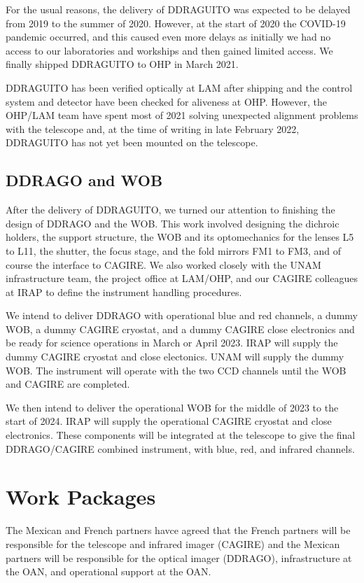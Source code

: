 \documentclass{article}
\begin{document}
For the usual reasons, the delivery of DDRAGUITO was expected to be delayed from 2019 to the summer of 2020. However, at the start of 2020 the COVID-19 pandemic occurred, and this caused even more delays as initially we had no access to our laboratories and workships and then gained limited access. We finally shipped DDRAGUITO to OHP in March 2021.

DDRAGUITO has been verified optically at LAM after shipping and the control system and detector have been checked for aliveness at OHP. However, the OHP/LAM team have spent most of 2021 solving unexpected alignment problems with the telescope and, at the time of writing in late February 2022, DDRAGUITO has not yet been mounted on the telescope.

\subsection{DDRAGO and WOB}

After the delivery of DDRAGUITO, we turned our attention to finishing the design of DDRAGO and the WOB. This work involved designing the dichroic holders, the support structure, the WOB and its optomechanics for the lenses L5 to L11, the shutter, the focus stage, and the fold mirrors FM1 to FM3, and of course the interface to CAGIRE. We also worked closely with the UNAM infrastructure team, the project office at LAM/OHP, and our CAGIRE colleagues at IRAP to define the instrument handling procedures.

We intend to deliver DDRAGO with operational blue and red channels, a dummy WOB, a dummy CAGIRE cryostat, and a dummy CAGIRE close electronics and be ready for science operations in March or April 2023. IRAP will supply the dummy CAGIRE cryostat and close electonics. UNAM will supply the dummy WOB. The instrument will operate with the two CCD channels until the WOB and CAGIRE are completed.

We then intend to deliver the operational WOB for the middle of 2023 to the start of 2024. IRAP will supply the operational CAGIRE cryostat and close electronics. These components will be integrated at the telescope to give the final DDRAGO/CAGIRE combined instrument, with blue, red, and infrared channels.

\clearpage
\section{Work Packages}

The Mexican and French partners havce agreed that the French partners will be responsible for the telescope and infrared imager (CAGIRE) and the Mexican partners will be responsible for the optical imager (DDRAGO), infrastructure at the OAN, and operational support at the OAN.
\end{document}
